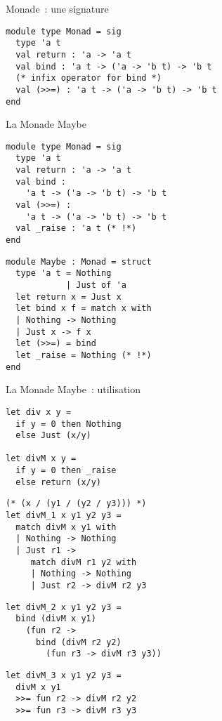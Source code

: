 \documentclass[10pt]{beamer}
\begin{document}
\begin{frame}[fragile]{Monade~: une signature}
  \begin{verbatim}
module type Monad = sig
  type 'a t
  val return : 'a -> 'a t
  val bind : 'a t -> ('a -> 'b t) -> 'b t
  (* infix operator for bind *)
  val (>>=) : 'a t -> ('a -> 'b t) -> 'b t
end
  \end{verbatim}
\end{frame}

\begin{frame}[fragile]{La Monade Maybe}
  \begin{multicols}{2}
\begin{verbatim}
module type Monad = sig
  type 'a t
  val return : 'a -> 'a t
  val bind :
    'a t -> ('a -> 'b t) -> 'b t
  val (>>=) :
    'a t -> ('a -> 'b t) -> 'b t
  val _raise : 'a t (* !*)
end
\end{verbatim}
\begin{verbatim}
module Maybe : Monad = struct
  type 'a t = Nothing
            | Just of 'a
  let return x = Just x
  let bind x f = match x with
  | Nothing -> Nothing
  | Just x -> f x
  let (>>=) = bind
  let _raise = Nothing (* !*)
end
\end{verbatim}
  \end{multicols}
\end{frame}

\begin{frame}[fragile]{La Monade Maybe~: utilisation}
  \begin{multicols*}{2}
\begin{verbatim}
let div x y =
  if y = 0 then Nothing
  else Just (x/y)

let divM x y =
  if y = 0 then _raise
  else return (x/y)
\end{verbatim}
    \pause{}
\begin{verbatim}
(* (x / (y1 / (y2 / y3))) *)
let divM_1 x y1 y2 y3 =
  match divM x y1 with
  | Nothing -> Nothing
  | Just r1 ->
     match divM r1 y2 with
     | Nothing -> Nothing
     | Just r2 -> divM r2 y3
\end{verbatim}
    \columnbreak{}
    \pause{}
\begin{verbatim}
let divM_2 x y1 y2 y3 =
  bind (divM x y1)
    (fun r2 ->
      bind (divM r2 y2)
        (fun r3 -> divM r3 y3))
\end{verbatim}
    \pause{}
\begin{verbatim}
let divM_3 x y1 y2 y3 =
  divM x y1
  >>= fun r2 -> divM r2 y2
  >>= fun r3 -> divM r3 y3
\end{verbatim}
  \end{multicols*}
\end{frame}
\end{document}
